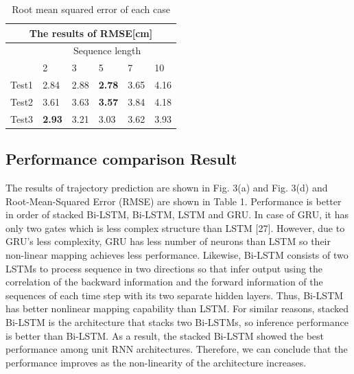 \documentclass[letterpaper, 10 pt, conference]{ieeeconf}  %
\begin{document}
\begin{table}[h]
	\centering
	\caption{Root mean squared error of each case}
	\begin{tabular}{clllll}
		\toprule
		\multicolumn{6}{c}{The results of RMSE[cm]}                         \\
		\midrule
		& \multicolumn{5}{c}{Sequence length} \\  \cmidrule{2-6}
		
		\multicolumn{1}{l}{} & 2     & 3       & 5      & 7    & 10  \\
		Test1                & 2.84  & 2.88    & \textbf{2.78}   & 3.65 & 4.16 \\
		Test2                & 3.61  & 3.63    & \textbf{3.57}   & 3.84 & 4.18 \\
		Test3                & \textbf{2.93}  & 3.21    & 3.03   & 3.62 & 3.93 \\
		\bottomrule 
		
	\end{tabular}
	\label{table:RMSE_sequence}
\end{table}

\subsection{Performance comparison Result}

The results of trajectory prediction are shown in Fig. 3(a) and Fig. 3(d) and
Root-Mean-Squared Error (RMSE) are shown in Table 1. Performance is better
in order of stacked Bi-LSTM, Bi-LSTM, LSTM and GRU. In case of GRU, it
has only two gates which is less complex structure than LSTM [27]. However,
due to GRU's less complexity, GRU has less number of neurons than LSTM so
their non-linear mapping achieves less performance. Likewise, Bi-LSTM consists
of two LSTMs to process sequence in two directions so that infer output using
the correlation of the backward information and the forward information of the
sequences of each time step with its two separate hidden layers. Thus, Bi-LSTM
has better nonlinear mapping capability than LSTM. For similar reasons, stacked
Bi-LSTM is the architecture that stacks two Bi-LSTMs, so inference performance
is better than Bi-LSTM. As a result, the stacked Bi-LSTM showed the best
performance among unit RNN architectures. Therefore, we can conclude that
the performance improves as the non-linearity of the architecture increases.
\end{document}
